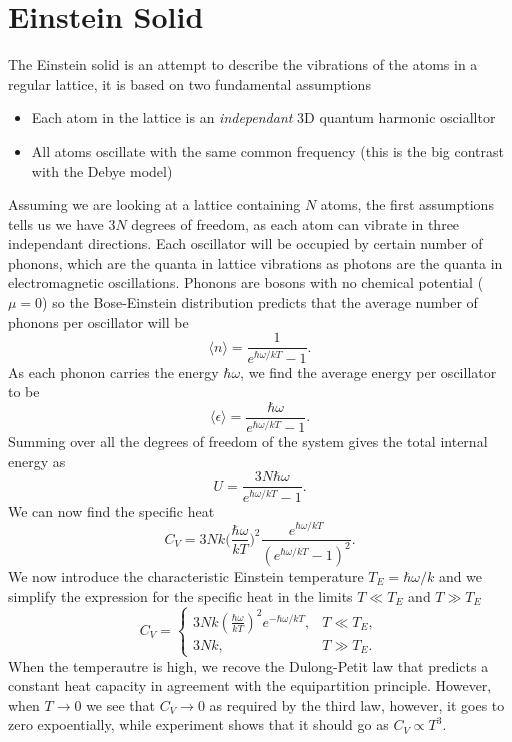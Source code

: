 \documentclass[a4paper, 11pt, notitlepage, english]{article}
\newcommand{\eps}{\epsilon}
\begin{document}
\clearpage

\section*{Einstein Solid}

The Einstein solid is an attempt to describe the vibrations of the atoms in a regular lattice, it is based on two fundamental assumptions
\begin{itemize}
	\item Each atom in the lattice is an \emph{independant} 3D quantum harmonic oscialltor
	\item All atoms oscillate with the same common frequency (this is the big contrast with the Debye model) 
\end{itemize}

Assuming we are looking at a lattice containing $N$ atoms, the first assumptions tells us we have $3N$ degrees of freedom, as each atom can vibrate in three independant directions. Each oscillator will be occupied by certain number of phonons, which are the quanta in lattice vibrations as photons are the quanta in electromagnetic oscillations. Phonons are bosons with no chemical potential ($\mu = 0$) so the Bose-Einstein distribution predicts that the average number of phonons per oscillator will be
$$\langle n \rangle = \frac{1}{e^{\hbar \omega/kT} - 1}.$$
As each phonon carries the energy $\hbar \omega$, we find the average energy per oscillator to be
$$\langle \eps \rangle = \frac{\hbar \omega}{e^{\hbar \omega/kT} - 1}.$$
Summing over all the degrees of freedom of the system gives the total internal energy as
$$U = \frac{3N\hbar \omega}{e^{\hbar \omega/kT} - 1}.$$
We can now find the specific heat
$$C_V = 3Nk \bigg(\frac{\hbar \omega}{kT}\bigg)^2 \frac{e^{\hbar \omega/kT}}{(e^{\hbar \omega/kT}-1)^2}.$$
We now introduce the characteristic Einstein temperature $T_E = \hbar \omega/k$ and we simplify the expression for the specific heat in the limits $T \ll T_E$ and $T \gg T_E$
$$C_V = \begin{cases}
	3Nk (\frac{\hbar\omega}{kT})^2 e^{-\hbar\omega/kT}, & T \ll T_E, \\
	3Nk, & T \gg T_E.
\end{cases}$$
When the temperautre is high, we recove the Dulong-Petit law that predicts a constant heat capacity in agreement with the equipartition principle. However, when $T\to 0$ we see that $C_V \to 0$ as required by the third law, however, it goes to zero expoentially, while experiment shows that it should go as $C_V \propto T^3$.
\end{document}
